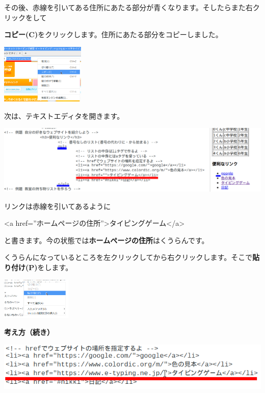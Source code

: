\documentclass[a4paper,12pt]{jarticle}
\begin{document}
\flushleft

その後、赤線を引いてある住所にあたる部分が青くなります。そしたらまた右クリックをして

\textbf{コピー(C)}をクリックします。住所にあたる部分をコピーしました。

\centering
\includegraphics[width=0.3\textwidth]{textbook-img197.png}

\bigskip
\flushleft

次は、テキストエディタを開きます。

\centering
\includegraphics[width=\textwidth]{textbook-img198.png}

\bigskip
\flushleft

リンクは赤線を引いてあるように

{\textless}a
href=”ホームページの住所”{\textgreater}タイピングゲーム{\textless}/a{\textgreater}

と書きます。今の状態では\textbf{ホームページの住所}はくうらんです。

くうらんになっているところを左クリックしてから右クリックします。そこで\textbf{貼り付け(P)}をします。





\centering
\includegraphics[width=0.25\textwidth]{textbook-img199.png}

\clearpage
\flushleft
\textbf{考え方（続き）}


\bigskip

\centering
\includegraphics[width=\textwidth]{textbook-img200.png}
\end{document}
